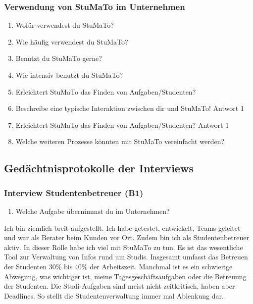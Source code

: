 \documentclass[
  12pt,
  ngerman,
  a4paper,
]{article}
\providecommand{\tightlist}{%
  \setlength{\itemsep}{0pt}\setlength{\parskip}{0pt}}
\begin{document}
\hypertarget{verwendung-von-stumato-im-unternehmen}{%
\subsubsection{Verwendung von StuMaTo im
Unternehmen}\label{verwendung-von-stumato-im-unternehmen}}

\begin{enumerate}
\def\labelenumi{\arabic{enumi}.}
\setcounter{enumi}{9}
\item
  Wofür verwendest du StuMaTo?
\item
  Wie häufig verwendest du StuMaTo?
\item
  Benutzt du StuMaTo gerne?
\item
  Wie intensiv benutzt du StuMaTo?
\item
  Erleichtert StuMaTo das Finden von Aufgaben/Studenten?
\item
  Beschreibe eine typische Interaktion zwischen dir und StuMaTo! Antwort
  1
\item
  Erleichtert StuMaTo das Finden von Aufgaben/Studenten? Antwort 1
\item
  Welche weiteren Prozesse könnten mit StuMaTo vereinfacht werden?
\end{enumerate}

\hypertarget{geduxe4chtnisprotokolle-der-interviews}{%
\subsection{Gedächtnisprotokolle der
Interviews}\label{geduxe4chtnisprotokolle-der-interviews}}

\hypertarget{interview-studentenbetreuer-b1}{%
\subsubsection{Interview Studentenbetreuer
(B1)}\label{interview-studentenbetreuer-b1}}

\begin{enumerate}
\def\labelenumi{\arabic{enumi}.}
\tightlist
\item
  Welche Aufgabe übernimmst du im Unternehmen?
\end{enumerate}

Ich bin ziemlich breit aufgestellt. Ich habe getestet, entwickelt, Teams
geleitet und war als Berater beim Kunden vor Ort. Zudem bin ich als
Studentenbetreuer aktiv. In dieser Rolle habe ich viel mit StuMaTo zu
tun. Es ist das wesentliche Tool zur Verwaltung von Infos rund um
Studis. Insgesamt umfasst das Betreuen der Studenten 30\% bis 40\% der
Arbeitszeit. Manchmal ist es ein schwierige Abwegung, was wichtiger ist,
meine Tagesgeschäftsaufgaben oder die Betreuung der Studenten. Die
Studi-Aufgaben sind meist nicht zeitkritisch, haben aber Deadlines. So
stellt die Studentenverwaltung immer mal Ablenkung dar.
\end{document}

